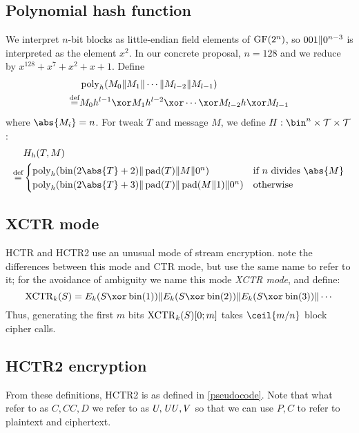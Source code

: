 \documentclass[hctr.tex]{subfiles}
\begin{document}
\subsection{Polynomial hash function}\label{hashspec}
We interpret \(n\)-bit blocks as little-endian field elements of \(\operatorname{GF}(2^n)\),
so \(001 \Vert 0^{n-3}\) is interpreted as the element \(x^2\).
In our concrete proposal, \(n=128\) and we reduce by
\(x^{128} + x^7 + x^2 + x + 1\).
Define
\begin{align*}
    & \poly_h(M_0 \Concat M_1 \Concat \cdots \Concat M_{l-2} \Concat M_{l-1}) \\
    \defeq & M_0h^{l-1} \xor M_1h^{l-2} \xor \cdots \xor M_{l-2}h \xor M_{l-1}
\end{align*}
where \(\abs{M_i} = n\). For tweak \(T\) and message \(M\), we define \(H: \bin^n \times \mathcal{T} \times \mathcal{T}\):
\begin{align*}
    & H_h(T, M) \\
    \defeq & 
    \begin{cases}
        \poly_h(\fromint(2\abs{T} + 2) \Concat \pad(T) \Concat M \Concat 0^n) &
        \text{if } n \text{ divides } \abs{M} \\
        \poly_h(\fromint(2\abs{T} + 3) \Concat \pad(T) \Concat \pad(M \Concat 1) \Concat 0^n) &
        \text{otherwise}
    \end{cases}
\end{align*}

\subsection{XCTR mode}

HCTR and HCTR2 use an unusual mode of stream encryption.
\cite{hctr,hctrquad} note the differences between this mode and 
CTR mode\cite{ctr},
but use the same name to refer to it; for the avoidance of ambiguity
we name this mode \emph{XCTR mode}, and define:
\begin{displaymath}
    \XCTR_k(S) = E_k(S \xor \fromint(1)) \Concat E_k(S \xor \fromint(2)) \Concat E_k(S \xor \fromint(3)) \Concat \cdots
\end{displaymath}
Thus, generating the first \(m\) bits \(\operatorname{XCTR}_k(S)[0; m]\) takes \(\ceil{m/n}\) block cipher calls. 

\subsection{HCTR2 encryption}

From these definitions, HCTR2 is as defined in \autoref{pseudocode}.
Note that what \cite{hctr,hctrquad} refer to as \(C, \mathit{CC}, D\)
we refer to as \(U, \mathit{UU}, V\)
so that we can use \(P, C\) to refer to plaintext and ciphertext.

\end{document}
